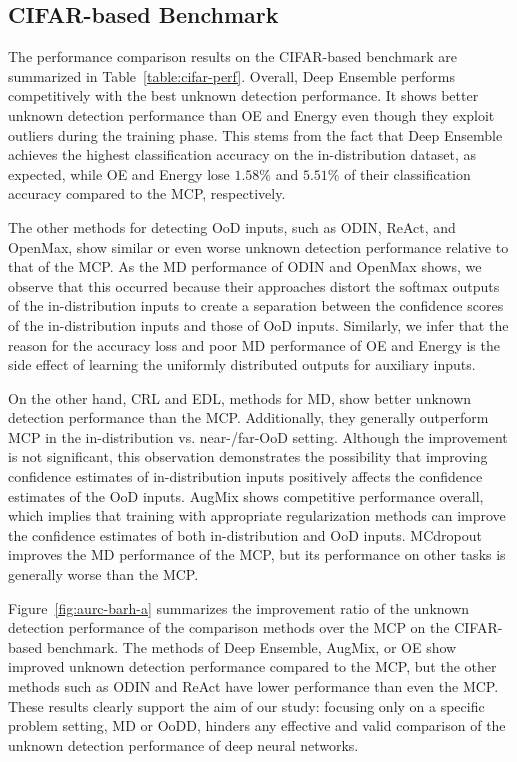 \documentclass[preprint,12pt]{elsarticle}
\begin{document}
\subsection{CIFAR-based Benchmark} \label{sec:section4.1}
The performance comparison results on the CIFAR-based benchmark are summarized in Table~\ref{table:cifar-perf}. 
Overall, Deep Ensemble performs competitively with the best unknown detection performance. It shows better unknown detection performance than OE and Energy even though they exploit outliers during the training phase. This stems from the fact that Deep Ensemble achieves the highest classification accuracy on the in-distribution dataset, as expected, while OE and Energy lose $1.58\%$ and $5.51\%$ of their classification accuracy compared to the MCP, respectively.

The other methods for detecting OoD inputs, such as ODIN, ReAct, and OpenMax, show similar or even worse unknown detection performance relative to that of the MCP. As the MD performance of ODIN and OpenMax shows, we observe that this occurred because their approaches distort the softmax outputs of the in-distribution inputs to create a separation between the confidence scores of the in-distribution inputs and those of OoD inputs. Similarly, we infer that the reason for the accuracy loss and poor MD performance of OE and Energy is the side effect of learning the uniformly distributed outputs for auxiliary inputs. 

On the other hand, CRL and EDL, methods for MD, show better unknown detection performance than the MCP. Additionally, they generally outperform MCP in the in-distribution vs. near-/far-OoD setting. Although the improvement is not significant, this observation demonstrates the possibility that improving confidence estimates of in-distribution inputs positively affects the confidence estimates of the OoD inputs. AugMix shows competitive performance overall, which implies that training with appropriate regularization methods can improve the confidence estimates of both in-distribution and OoD inputs. MCdropout improves the MD performance of the MCP, but its performance on other tasks is generally worse than the MCP.

Figure~\ref{fig:aurc-barh-a} summarizes the improvement ratio of the unknown detection performance of the comparison methods over the MCP on the CIFAR-based benchmark. The methods of Deep Ensemble, AugMix, or OE show improved unknown detection performance compared to the MCP, but the other methods such as ODIN and ReAct have lower performance than even the MCP. These results clearly support the aim of our study: focusing only on a specific problem setting, MD or OoDD, hinders any effective and valid comparison of the unknown detection performance of deep neural networks.
\end{document}
